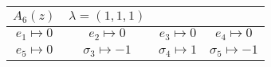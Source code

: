 \documentclass[11pt,a4paper,reqno,svgnames]{amsart}
\theoremstyle{plain}
\theoremstyle{definition}
\numberwithin{equation}{section}
\begin{document}
\begin{table}[hhh]
\centering
\begin{tabular}{cccc}
 \toprule
 $A_{6}(z)$ & $\lambda=(1,1,1)$\\
 \midrule
 $e_1\mapsto 0$ & $e_2\mapsto 0$ & $e_3\mapsto 0$ & $e_4\mapsto 0$\\
$e_5\mapsto 0$ & $\sigma_3\mapsto -1$ &$\sigma_4\mapsto 1$ &$\sigma_5\mapsto -1$
\medskip\\
\bottomrule
\end{tabular}
\end{table}




\end{document}
